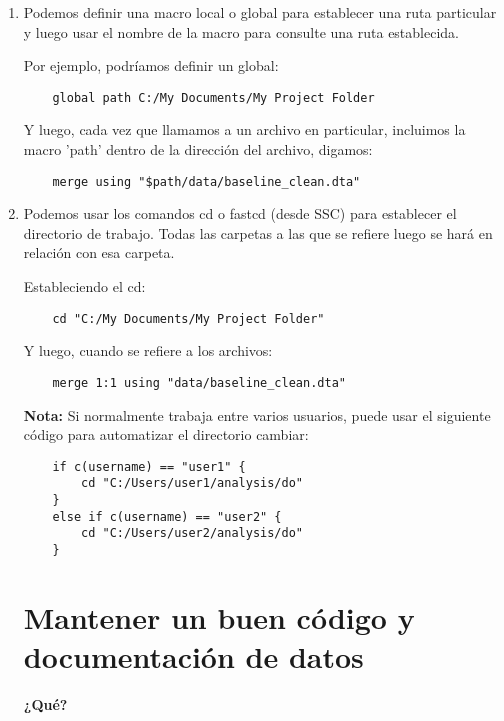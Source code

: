 \documentclass[11pt,en]{elegantpaper}
\begin{document}
\begin{enumerate}
 
\item Podemos definir una macro local o global para establecer una ruta particular y luego usar el nombre de la macro para consulte una ruta establecida.

Por ejemplo, podríamos definir un global:

\begin{lstlisting}
	global path C:/My Documents/My Project Folder
\end{lstlisting}

Y luego, cada vez que llamamos a un archivo en particular, incluimos la macro 'path' dentro de la dirección del archivo, digamos:

\begin{lstlisting}
	merge using "$path/data/baseline_clean.dta"
\end{lstlisting}

\item Podemos usar los comandos cd o fastcd (desde SSC) para establecer el directorio de trabajo. Todas las carpetas a las que se refiere luego se hará en relación con esa carpeta.

Estableciendo el cd:

\begin{lstlisting}
	cd "C:/My Documents/My Project Folder"
\end{lstlisting}

Y luego, cuando se refiere a los archivos:

\begin{lstlisting}
	merge 1:1 using "data/baseline_clean.dta"
\end{lstlisting}

\textbf{Nota:} Si normalmente trabaja entre varios usuarios, puede usar el siguiente código para automatizar el directorio cambiar:

\begin{lstlisting}
	if c(username) == "user1" {
		cd "C:/Users/user1/analysis/do"
	}
	else if c(username) == "user2" {
		cd "C:/Users/user2/analysis/do"
	}
\end{lstlisting}


\newpage 
\section{Mantener un buen código y documentación de datos}
\label{sec:documentacion}
\noindent
\textbf{¿Qué?}


\end{enumerate}
\end{document}
